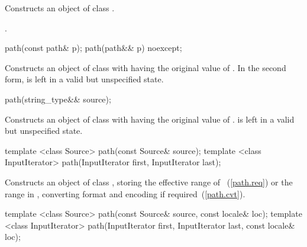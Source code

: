 \begin{itemdescr}
\pnum
\effects Constructs an object of class .

\pnum
\postconditions {}.
\end{itemdescr}

%
\begin{itemdecl}
path(const path& p);
path(path&& p) noexcept;
\end{itemdecl}

\begin{itemdescr}
\pnum
\effects
Constructs an object of class  with
 having the original value of .
In the second form,  is left in a valid but unspecified state.
\end{itemdescr}

%
\begin{itemdecl}
path(string_type&& source);
\end{itemdecl}

\begin{itemdescr}
\pnum
\effects
Constructs an object of class  with
 having the original value of .
 is left in a valid but unspecified state.
\end{itemdescr}

%
\begin{itemdecl}
template <class Source>
  path(const Source& source);
template <class InputIterator>
  path(InputIterator first, InputIterator last);
\end{itemdecl}

\begin{itemdescr}
\pnum
\effects Constructs an object of class , storing the effective range of ~(\ref{path.req})
  or the range  in ,
  converting format and encoding if required~(\ref{path.cvt}).
\end{itemdescr}

%
\begin{itemdecl}
template <class Source>
  path(const Source& source, const locale& loc);
template <class InputIterator>
  path(InputIterator first, InputIterator last, const locale& loc);
\end{itemdecl}


